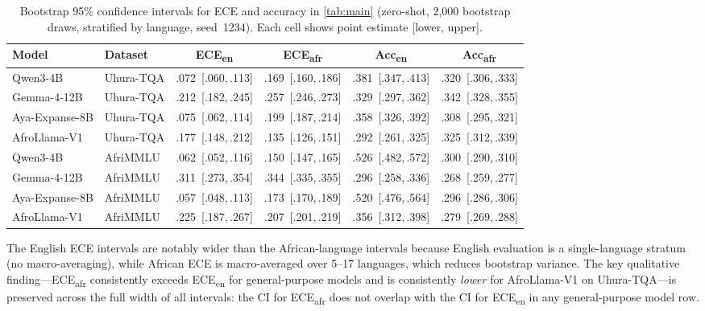 \documentclass[11pt,a4paper]{article}
\begin{document}
\begin{table}[H]
\centering
\caption{%
  Bootstrap 95\% confidence intervals for ECE and accuracy in \cref{tab:main}
  (zero-shot, 2{,}000 bootstrap draws, stratified by language, seed~1234).
  Each cell shows point estimate [lower, upper].
}
\label{tab:bootstrap_ci}
\small
\setlength{\tabcolsep}{4pt}
\begin{tabular}{llcccc}
\toprule
\textbf{Model} & \textbf{Dataset}
  & \textbf{ECE\textsubscript{en}}
  & \textbf{ECE\textsubscript{afr}}
  & \textbf{Acc\textsubscript{en}}
  & \textbf{Acc\textsubscript{afr}} \\
\midrule
Qwen3-4B      & Uhura-TQA
  & .072\ [.060,\,.113] & .169\ [.160,\,.186]
  & .381\ [.347,\,.413] & .320\ [.306,\,.333] \\
Gemma-4-12B   & Uhura-TQA
  & .212\ [.182,\,.245] & .257\ [.246,\,.273]
  & .329\ [.297,\,.362] & .342\ [.328,\,.355] \\
Aya-Expanse-8B & Uhura-TQA
  & .075\ [.062,\,.114] & .199\ [.187,\,.214]
  & .358\ [.326,\,.392] & .308\ [.295,\,.321] \\
AfroLlama-V1  & Uhura-TQA
  & .177\ [.148,\,.212] & .135\ [.126,\,.151]
  & .292\ [.261,\,.325] & .325\ [.312,\,.339] \\
\midrule
Qwen3-4B      & AfriMMLU
  & .062\ [.052,\,.116] & .150\ [.147,\,.165]
  & .526\ [.482,\,.572] & .300\ [.290,\,.310] \\
Gemma-4-12B   & AfriMMLU
  & .311\ [.273,\,.354] & .344\ [.335,\,.355]
  & .296\ [.258,\,.336] & .268\ [.259,\,.277] \\
Aya-Expanse-8B & AfriMMLU
  & .057\ [.048,\,.113] & .173\ [.170,\,.189]
  & .520\ [.476,\,.564] & .296\ [.286,\,.306] \\
AfroLlama-V1  & AfriMMLU
  & .225\ [.187,\,.267] & .207\ [.201,\,.219]
  & .356\ [.312,\,.398] & .279\ [.269,\,.288] \\
\bottomrule
\end{tabular}
\end{table}

The English ECE intervals are notably wider than the African-language intervals
because English evaluation is a single-language stratum (no macro-averaging),
while African ECE is macro-averaged over 5--17 languages, which reduces
bootstrap variance. The key qualitative finding---ECE\textsubscript{afr}
consistently exceeds ECE\textsubscript{en} for general-purpose models and is
consistently \emph{lower} for AfroLlama-V1 on Uhura-TQA---is preserved across
the full width of all intervals: the CI for ECE\textsubscript{afr} does not
overlap with the CI for ECE\textsubscript{en} in any general-purpose model row.
\end{document}

